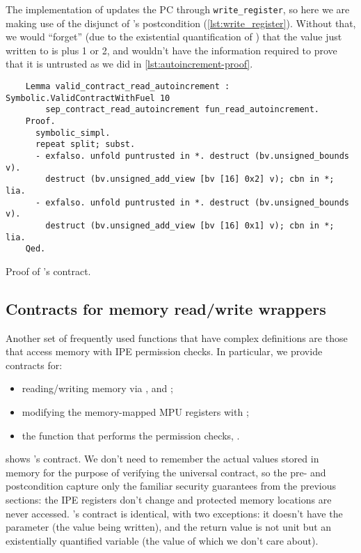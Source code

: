 The implementation of  updates the PC through \texttt{write\_reg\-is\-ter}, so here we are making use of the disjunct  of 's postcondition (\cref{lst:write_register}). Without that, we would ``forget'' (due to the existential quantification of ) that the value just written to  is  plus 1 or 2, and wouldn't have the information required to prove that it is untrusted as we did in \cref{lst:autoincrement-proof}.

\begin{listing}[hb]
  \begin{verbatim}
    Lemma valid_contract_read_autoincrement : Symbolic.ValidContractWithFuel 10
        sep_contract_read_autoincrement fun_read_autoincrement.
    Proof.
      symbolic_simpl.
      repeat split; subst.
      - exfalso. unfold puntrusted in *. destruct (bv.unsigned_bounds v).
        destruct (bv.unsigned_add_view [bv [16] 0x2] v); cbn in *; lia.
      - exfalso. unfold puntrusted in *. destruct (bv.unsigned_bounds v).
        destruct (bv.unsigned_add_view [bv [16] 0x1] v); cbn in *; lia.
    Qed.
  \end{verbatim}
  \caption{Proof of 's contract.}
  \label{lst:autoincrement-proof}
\end{listing}

\subsection{Contracts for memory read/write wrappers}

Another set of frequently used functions that have complex definitions are those that access memory with IPE permission checks. In particular, we provide contracts for:
\begin{itemize}
\item reading/writing memory via ,  and ;
\item modifying the memory-mapped MPU registers with ;
\item the function that performs the permission checks, .
\end{itemize}

 shows 's contract. We don't need to remember the actual values stored in memory for the purpose of verifying the universal contract, so the pre- and postcondition capture only the familiar security guarantees from the previous sections: the IPE registers don't change and protected memory locations are never accessed. 's contract is identical, with two exceptions: it doesn't have the  parameter (the value being written), and the return value is not unit but an existentially quantified variable (the value of which we don't care about).

